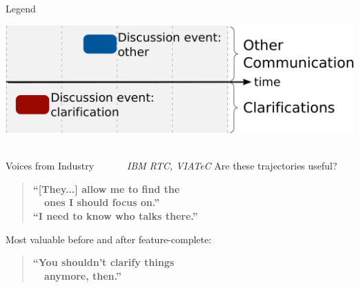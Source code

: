 \documentclass[final]{beamer} %
\newcommand{\marker}[1]{\textbf{\color{knaccentcolor1} #1}}
\begin{document}
\begin{frame}{}
\begin{columns}[t]
\begin{column}{.45\linewidth}

    
\begin{block}{Legend}
\begin{center}
\vspace{-0.5cm}
\includegraphics[width=0.9\linewidth]{img/pattern-legend} ~
\end{center}
\vspace{-0.5cm}
\end{block}

\begin{block}{Voices from Industry  \emph{\footnotesize ~~~~~~IBM RTC, VIATeC}}
\vspace{-0.2cm}
{\small Are these trajectories useful?}
\begin{quote}
\marker{\small“[They...] allow me to find the \\ ~~ones I should focus on.” \\ “I need to know who talks there.”}
\end{quote}
{\small Most valuable before and after feature-complete:}
\begin{quote}
\marker{\small“You shouldn’t clarify things \\~~anymore, then.”}
\end{quote}%
\end{block}
\end{column}



\end{columns}
\end{frame}
\end{document}
